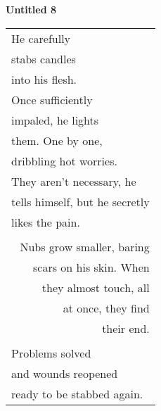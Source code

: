 \documentclass{article}
\begin{document}
\begin{center}
\textbf{Untitled 8} \\
\vspace*{2ex}
\begin{tabular}{l}
He carefully \\
stabs candles \\
into his flesh. \\
Once sufficiently \\
impaled, he lights \\
them.  One by one, \\
dribbling hot worries. \\
They aren't necessary, he \\
tells himself, but he secretly \\
likes the pain. \\
\\
\multicolumn{1}{r}{Nubs grow smaller, baring} \\
\multicolumn{1}{r}{scars on his skin.  When} \\
\multicolumn{1}{r}{they almost touch, all} \\
\multicolumn{1}{r}{at once, they find} \\
\multicolumn{1}{r}{their end.} \\
\\
Problems solved \\
\hspace*{4ex}and wounds reopened \\
ready to be stabbed again. \\
\end{tabular}
\end{center}
\end{document}
